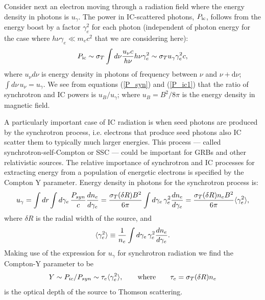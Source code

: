 \documentclass[12pt,a4paper]{article}
\newcommand{\dif}{\mathrm{d}}
\begin{document}
Consider next an electron moving through a radiation field
where the energy density in photons is $u_\gamma$. The power in 
IC-scattered photons, $P_{\rm ic}$, follows from the energy boost 
by a factor $\gamma_e^2$ for each photon (independent of 
photon energy for the case where $h\nu\gamma_e \ll m_e c^2$
that we are considering here):
\begin{equation}
   P_{\rm ic} \sim \sigma_T \int d\nu {u_\nu c\over h\nu} h\nu\gamma_e^2
     \sim \sigma_T u_\gamma \gamma_e^2 c,
  \label{P_ic1}
\end{equation}
where $u_\nu d\nu$ is energy density in photons of frequency between $\nu$ and $\nu+\dif \nu$; $\int d\nu \, u_\nu = u_\gamma$.
We see from equations (\ref{P_syn}) and (\ref{P_ic1}) that the ratio of synchrotron and IC powers is $u_B/u_\gamma$; where $u_B = B^2/8\pi$ is the energy density in magnetic field.

A particularly important case of IC radiation is when seed photons
are produced by the synchrotron process, i.e. electrons that produce
seed photons also IC scatter them to typically much larger energies. 
This process --- called synchrotron-self-Compton or SSC --- could be 
important for GRBs and other relativistic sources. 
The relative importance of synchrotron and IC processes for extracting
energy from a population of energetic electrons is specified by the 
Compton Y parameter. Energy density in photons for the synchrotron process is:
\begin{equation}
   u_\gamma = \int dr \int d\gamma_e\, {P_{syn}\over c} {d n_e\over 
     d\gamma_e} = {\sigma_T (\delta R) B^2 \over 6\pi} 
     \int d\gamma_e\, \gamma_e^2
      {d n_e\over d\gamma_e} = {\sigma_T (\delta R) n_e B^2 \over 6\pi} 
      \langle \gamma_e^2 \rangle,
\end{equation}
where $\delta R$ is the radial width of the source, and 
\begin{equation}
   \langle \gamma_e^2 \rangle \equiv {1\over n_e} \int d\gamma_e\, 
   \gamma_e^2 {d n_e\over d\gamma_e}.
\end{equation}
Making use of the expression for $u_\gamma$ for synchrotron radiation
we find the Compton-Y parameter to be
\begin{equation}
    Y \sim P_{ic}/P_{syn} \sim \tau_e \langle \gamma_e^2\rangle, 
   \quad\quad{\rm where} \quad\quad
          \tau_e = \sigma_T (\delta R) n_e
  \label{Y-expression1}
\end{equation}
is the optical depth of the source to Thomson scattering. 
\end{document}
